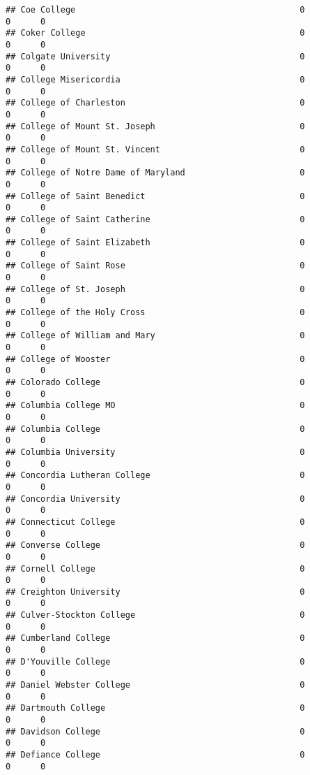 \documentclass[
]{article}
\begin{document}
\begin{verbatim}
## Coe College                                             0          0      0
## Coker College                                           0          0      0
## Colgate University                                      0          0      0
## College Misericordia                                    0          0      0
## College of Charleston                                   0          0      0
## College of Mount St. Joseph                             0          0      0
## College of Mount St. Vincent                            0          0      0
## College of Notre Dame of Maryland                       0          0      0
## College of Saint Benedict                               0          0      0
## College of Saint Catherine                              0          0      0
## College of Saint Elizabeth                              0          0      0
## College of Saint Rose                                   0          0      0
## College of St. Joseph                                   0          0      0
## College of the Holy Cross                               0          0      0
## College of William and Mary                             0          0      0
## College of Wooster                                      0          0      0
## Colorado College                                        0          0      0
## Columbia College MO                                     0          0      0
## Columbia College                                        0          0      0
## Columbia University                                     0          0      0
## Concordia Lutheran College                              0          0      0
## Concordia University                                    0          0      0
## Connecticut College                                     0          0      0
## Converse College                                        0          0      0
## Cornell College                                         0          0      0
## Creighton University                                    0          0      0
## Culver-Stockton College                                 0          0      0
## Cumberland College                                      0          0      0
## D'Youville College                                      0          0      0
## Daniel Webster College                                  0          0      0
## Dartmouth College                                       0          0      0
## Davidson College                                        0          0      0
## Defiance College                                        0          0      0

\end{verbatim}
\end{document}
